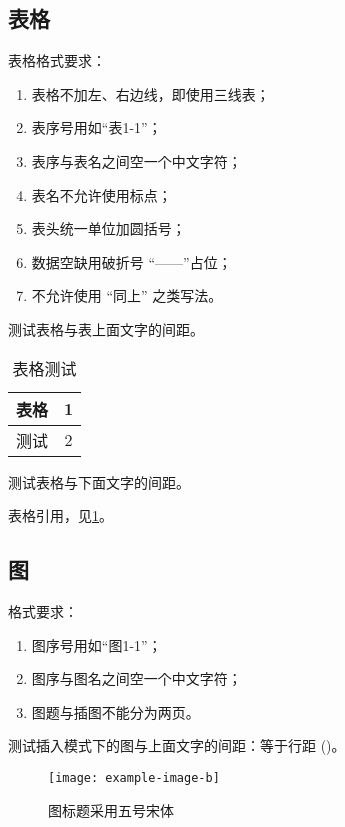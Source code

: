 \documentclass{swputhesis}
\begin{document}
\subsection{表格}

表格格式要求：

\begin{enumerate}
	\item 表格不加左、右边线，即使用三线表；
	\item	表序号用如``表1-1''；
	\item 表序与表名之间空一个中文字符；
	\item 表名不允许使用标点；
	\item 表头统一单位加圆括号；
	\item 数据空缺用破折号 ``——''占位；
	\item 不允许使用 ``同上'' 之类写法。
\end{enumerate}

测试表格与表上面文字的间距。

\begin{table}[htb]
	\centering
	\caption{表格测试}
	\label{tab:a}
	\begin{tabular}{cc}
		\toprule
		表格 & 1  \\
		\midrule
		测试 & 2  \\
		\bottomrule
	\end{tabular}
\end{table}

测试表格与下面文字的间距。

表格引用，见\cref{tab:a}。

\subsection{图}

格式要求：

\begin{enumerate}
	\item	图序号用如``图1-1''；
	\item 图序与图名之间空一个中文字符；
	\item 图题与插图不能分为两页。
\end{enumerate}

测试插入模式下的图与上面文字的间距：等于行距 (\the\textfloatsep)。

\begin{figure}[h]
	\centering
	\texttt{[image: example-image-b]}
	\caption{图标题采用五号宋体}
	\label{fig:a}
\end{figure}
\end{document}

